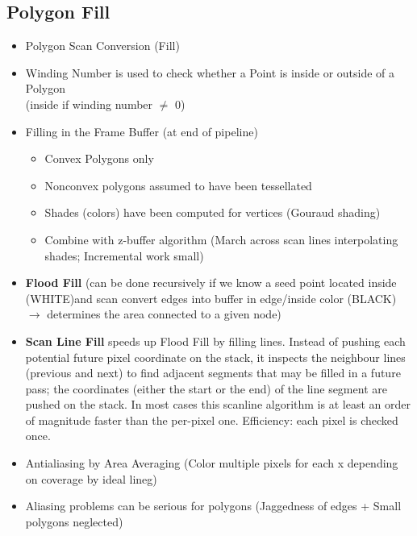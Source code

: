 \documentclass[11pt,a4paper]{article}
\begin{document}
	\subsection{Polygon Fill}
		\begin{itemize}
			\item Polygon Scan Conversion (Fill)
			\item Winding Number is used to check whether a Point is inside or outside of a Polygon\\
				(inside if winding number $\ne$ 0)
			\item Filling in the Frame Buffer (at end of pipeline)
				\begin{itemize}
					\item Convex Polygons only
					\item Nonconvex polygons assumed to have been tessellated
					\item Shades (colors) have been computed for vertices (Gouraud shading)
					\item Combine with z-buffer algorithm (March across scan lines interpolating shades; Incremental work small)
				\end{itemize}
			\item \textbf{Flood Fill} (can be done recursively if we know a seed point located inside (WHITE)and scan convert edges into buffer in edge/inside color
			(BLACK) $\rightarrow$ determines the area connected to a given node)
			\item \textbf{Scan Line Fill} speeds up Flood Fill by filling lines. Instead of pushing each potential future pixel coordinate on the stack, it inspects the neighbour lines (previous and next) to find adjacent segments that may be filled in a future pass; the coordinates (either the start or the end) of the line segment are pushed on the stack. In most cases this scanline algorithm is at least an order of magnitude faster than the per-pixel one.
			Efficiency: each pixel is checked once.
			\item Antialiasing by Area Averaging (Color multiple pixels for each x depending on coverage by ideal lineg)
			\item Aliasing problems can be serious for polygons (Jaggedness of edges + Small polygons neglected)
		\end{itemize}
\end{document}
